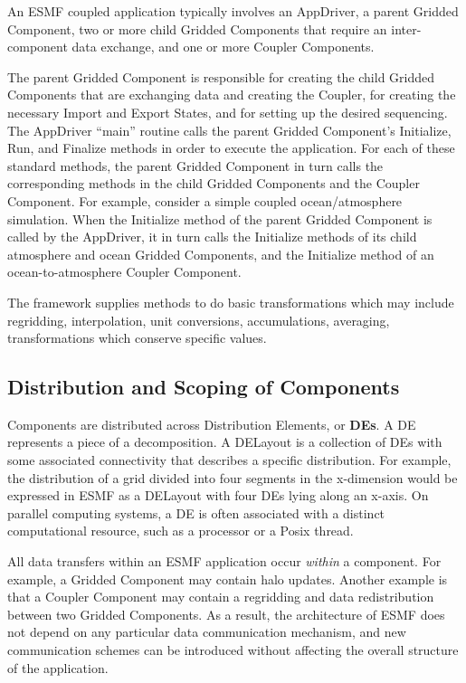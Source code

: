 An ESMF coupled application typically involves an AppDriver, a parent 
Gridded Component, two or more child Gridded Components that require 
an inter-component data exchange, and one or more Coupler 
Components. 

The parent Gridded Component is responsible for creating the child 
Gridded Components that are exchanging data and creating the Coupler, 
for creating the necessary Import and Export States, and for 
setting up the desired sequencing.  The AppDriver ``main'' routine
calls the parent Gridded Component's Initialize, Run, and Finalize 
methods in order to execute the application.  For each of these
standard methods, the parent Gridded Component in turn calls the 
corresponding methods in the child Gridded Components and the 
Coupler Component.  For example, consider a simple coupled 
ocean/atmosphere simulation.  When the Initialize method of the 
parent Gridded Component is called by the AppDriver, it in turn 
calls the Initialize methods of its child atmosphere and ocean 
Gridded Components, and the Initialize method of an 
ocean-to-atmosphere Coupler Component.

The framework supplies methods to do basic transformations which 
may include regridding, interpolation, unit conversions, 
accumulations, averaging, transformations which conserve specific 
values.

\subsection{Distribution and Scoping of Components}
\label{sec:scoping}

Components are distributed across Distribution Elements, or {\bf DEs}.
A DE represents a piece of a decomposition.  A DELayout is a collection
of DEs with some associated connectivity that describes a specific 
distribution.  For example, the distribution of a grid divided 
into four segments in the x-dimension would be expressed in ESMF as
a DELayout with four DEs lying along an x-axis. On parallel computing
systems, a DE is often associated with a distinct computational resource, 
such as a processor or a Posix thread.  

All data transfers within an ESMF application occur {\it within} a 
component.  For example, a Gridded Component may contain halo updates.
Another example is that a Coupler Component may contain a regridding 
and data redistribution between two Gridded Components.  As a result, 
the architecture of ESMF does not depend on any particular data 
communication mechanism, and new communication schemes can be 
introduced without affecting the overall structure of the application.

